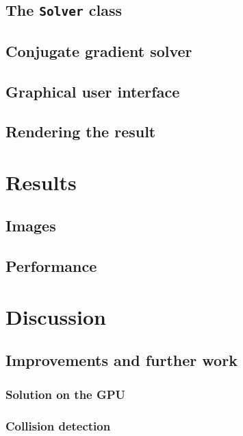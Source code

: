 \documentclass[10pt,a4paper]{article}
\begin{document}
\subsection{The \texttt{Solver} class}
\subsubsection{}
\subsubsection{}
\subsubsection{}
\subsection{Conjugate gradient solver}

\subsection{Graphical user interface}

\subsection{Rendering the result}


\section{Results}
\subsection{Images}

\subsection{Performance}

\section{Discussion}
\subsection{Improvements and further work}
\subsubsection{Solution on the GPU}


\subsubsection{Collision detection}


\pagebreak
{}


\end{document}
